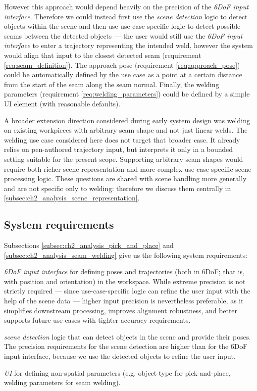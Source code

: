 However this approach would depend heavily on the precision of the \emph{6DoF input interface}. Therefore we could instead first use the \emph{scene detection} logic to detect objects within the scene and then use use-case-specific logic to detect possible seams between the detected objects --- the user would still use the \emph{6DoF input interface} to enter a trajectory representing the intended weld, however the system would align that input to the closest detected seam (requirement \ref{req:seam_definition}). The approach pose (requirement \ref{req:approach_pose}) could be automatically defined by the use case as a point at a certain distance from the start of the seam along the seam normal. Finally, the welding parameters (requirement \ref{req:welding_parameters}) could be defined by a simple UI element (with reasonable defaults).

A broader extension direction considered during early system design was welding on existing workpieces with arbitrary seam shape and not just linear welds. The welding use case considered here does not target that broader case. It already relies on pen-authored trajectory input, but interprets it only in a bounded setting suitable for the present scope. Supporting arbitrary seam shapes would require both richer scene representation and more complex use-case-specific scene processing logic. These questions are shared with scene handling more generally and are not specific only to welding: therefore we discuss them centrally in \autoref{subsec:ch2_analysis_scene_representation}.

\subsection{System requirements} \label{subsec:ch2_analysis_system_requirements}

Subsections \ref{subsec:ch2_analysis_pick_and_place} and \ref{subsec:ch2_analysis_seam_welding} give us the following system requirements:
\begin{requirements}
    \item \emph{6DoF input interface} for defining poses and trajectories (both in 6DoF; that is, with position and orientation) in the workspace. While extreme precision is not strictly required --- since use-case-specific logic can refine the user input with the help of the scene data --- higher input precision is nevertheless preferable, as it simplifies downstream processing, improves alignment robustness, and better supports future use cases with tighter accuracy requirements. \label{req:6DoF_input_interface}
    \item \emph{scene detection} logic that can detect objects in the scene and provide their poses. The precision requirements for the scene detection are higher than for the 6DoF input interface, because we use the detected objects to refine the user input. \label{req:scene_detection_logic}
    \item \emph{UI} for defining non-spatial parameters (e.g. object type for pick-and-place, welding parameters for seam welding). \label{req:ui}
\end{requirements}

